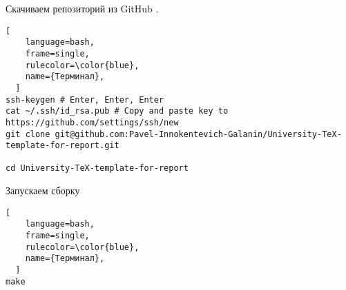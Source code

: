 \documentclass[12pt, a4paper, simple]{eskdtext}
\begin{document}
  Скачиваем репозиторий из GitHub \cite{github}.

  \begin{lstlisting}[
    language=bash,
    frame=single,
    rulecolor=\color{blue},
    name={Терминал},
  ]
ssh-keygen # Enter, Enter, Enter
cat ~/.ssh/id_rsa.pub # Copy and paste key to https://github.com/settings/ssh/new
git clone git@github.com:Pavel-Innokentevich-Galanin/University-TeX-template-for-report.git

cd University-TeX-template-for-report
\end{lstlisting}

  Запускаем сборку

  \begin{lstlisting}[
    language=bash,
    frame=single,
    rulecolor=\color{blue},
    name={Терминал},
  ]
make
\end{lstlisting}


  \newpage

  

  










\end{document}
